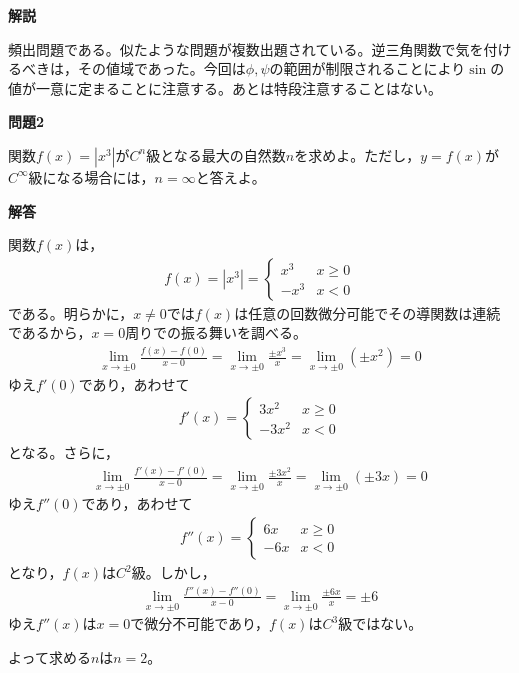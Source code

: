 \documentclass[a4paper,12pt,dvipdfmx,fleqn, oneside]{jsarticle}
\theoremstyle{defstyle}
\theoremstyle{thmx}
\theoremstyle{qesstyle}
\begin{document}
\textbf{解説}

頻出問題である。似たような問題が複数出題されている。逆三角関数で気を付けるべきは，その値域であった。今回は$\phi , \psi$の範囲が制限されることにより$\sin$の値が一意に定まることに注意する。あとは特段注意することはない。

\begin{shadebox}
    \textbf{問題2}

    \text{　}関数$f(x)=\left|x^3\right|$が$C^n$級となる最大の自然数$n$を求めよ。ただし，$y=f(x)$が$C^{\infty}$級になる場合には，$n=\infty$と答えよ。
\end{shadebox}

\begin{screen}
    \textbf{解答}

    \text{　}関数$f(x)$は，
    \begin{align*}
        f(x)= |x^3| = \begin{cases}
            x^3  & x \geq 0 \\
            -x^3 & x < 0
        \end{cases}
    \end{align*}
    である。明らかに，$x \neq 0$では$f(x)$は任意の回数微分可能でその導関数は連続であるから，$x= 0$周りでの振る舞いを調べる。
    \begin{align*}
        \lim_{x \to \pm 0} \frac{f(x)-f(0)}{x-0} = \lim_{x \to \pm 0} \frac{\pm x^3}{x} = \lim_{x \to \pm 0} (\pm x^2) =0
    \end{align*}
    ゆえ$f'(0)$であり，あわせて
    \begin{align*}
        f'(x) = \begin{cases}
            3x^2   & x  \geq 0 \\
            - 3x^2 & x <0
        \end{cases}
    \end{align*}
    となる。さらに，
    \begin{align*}
        \lim_{x \to \pm 0} \frac{f'(x)-f'(0)}{x-0} = \lim_{x \to \pm 0} \frac{\pm 3x^2}{x} = \lim_{x \to \pm 0} (\pm 3x) =0
    \end{align*}
    ゆえ$f''(0)$であり，あわせて
    \begin{align*}
        f''(x) = \begin{cases}
            6x  & x \geq 0 \\
            -6x & x <0
        \end{cases}
    \end{align*}
    となり，$f(x)$は$C^2$級。しかし，
    \begin{align*}
        \lim_{x \to \pm 0} \frac{f''(x)-f''(0)}{x-0} = \lim_{x \to \pm 0} \frac{\pm 6x}{x} = \pm 6
    \end{align*}
    ゆえ$f''(x)$は$x=0$で微分不可能であり，$f(x)$は$C^3$級ではない。

    \text{　}よって求める$n$は$n=2$。
\end{screen}
\end{document}
